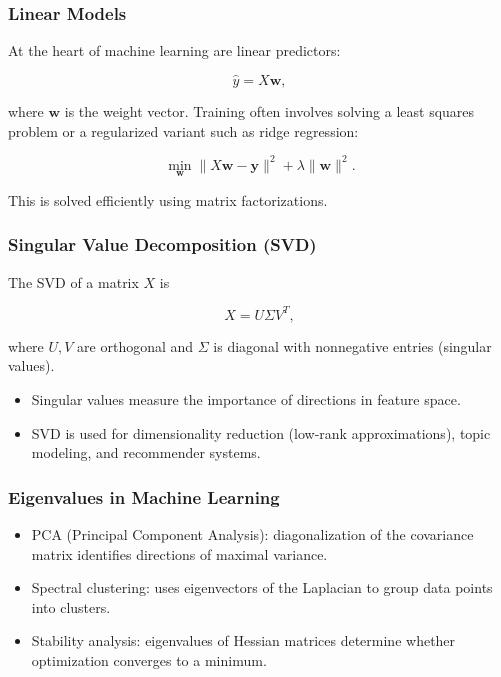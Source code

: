\documentclass[
  12pt,
  a4paper,
]{article}
\begin{document}
\subsubsection{Linear Models}\label{linear-models}

At the heart of machine learning are linear predictors:

\[\hat{y} = X\mathbf{w},\]

where \(\mathbf{w}\) is the weight vector. Training often involves
solving a least squares problem or a regularized variant such as ridge
regression:

\[\min_{\mathbf{w}} \|X\mathbf{w} - \mathbf{y}\|^2 + \lambda \|\mathbf{w}\|^2.\]

This is solved efficiently using matrix factorizations.

\subsubsection{Singular Value Decomposition
(SVD)}\label{singular-value-decomposition-svd}

The SVD of a matrix \(X\) is

\[X = U \Sigma V^T,\]

where \(U, V\) are orthogonal and \(\Sigma\) is diagonal with
nonnegative entries (singular values).

\begin{itemize}
\item
  Singular values measure the importance of directions in feature space.
\item
  SVD is used for dimensionality reduction (low-rank approximations),
  topic modeling, and recommender systems.
\end{itemize}

\subsubsection{Eigenvalues in Machine
Learning}\label{eigenvalues-in-machine-learning}

\begin{itemize}
\item
  PCA (Principal Component Analysis): diagonalization of the covariance
  matrix identifies directions of maximal variance.
\item
  Spectral clustering: uses eigenvectors of the Laplacian to group data
  points into clusters.
\item
  Stability analysis: eigenvalues of Hessian matrices determine whether
  optimization converges to a minimum.
\end{itemize}
\end{document}
